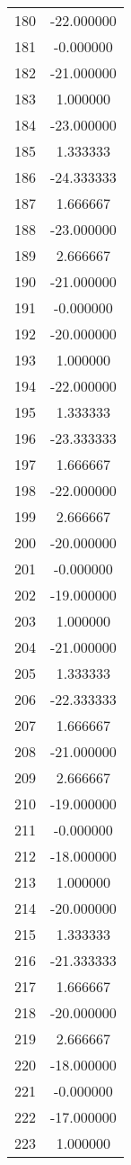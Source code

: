 \documentclass[12pt]{article}
\begin{document}
\begin{longtable}{@{}cc@{}}
180 & -22.000000 \\
181 & -0.000000 \\
182 & -21.000000 \\
183 & 1.000000 \\
184 & -23.000000 \\
185 & 1.333333 \\
186 & -24.333333 \\
187 & 1.666667 \\
188 & -23.000000 \\
189 & 2.666667 \\
190 & -21.000000 \\
191 & -0.000000 \\
192 & -20.000000 \\
193 & 1.000000 \\
194 & -22.000000 \\
195 & 1.333333 \\
196 & -23.333333 \\
197 & 1.666667 \\
198 & -22.000000 \\
199 & 2.666667 \\
200 & -20.000000 \\
201 & -0.000000 \\
202 & -19.000000 \\
203 & 1.000000 \\
204 & -21.000000 \\
205 & 1.333333 \\
206 & -22.333333 \\
207 & 1.666667 \\
208 & -21.000000 \\
209 & 2.666667 \\
210 & -19.000000 \\
211 & -0.000000 \\
212 & -18.000000 \\
213 & 1.000000 \\
214 & -20.000000 \\
215 & 1.333333 \\
216 & -21.333333 \\
217 & 1.666667 \\
218 & -20.000000 \\
219 & 2.666667 \\
220 & -18.000000 \\
221 & -0.000000 \\
222 & -17.000000 \\
223 & 1.000000 \\

\end{longtable}
\end{document}
